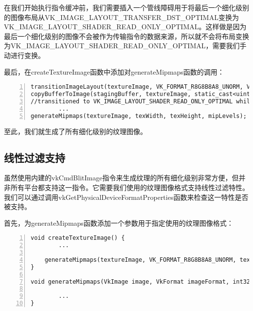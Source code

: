 \documentclass{ctexart}
\begin{document}
在我们开始执行指令缓冲前，我们需要插入一个管线障碍用于将最后一个细化级别的图像布局从VK\_IMAGE\_LAYOUT\_TRANSFER\_DST\_OPTIMAL变换为VK\_IMAGE\_LAYOUT\_SHADER\_READ\_ONLY\_OPTIMAL。这样做是因为最后一个细化级别的图像不会被作为传输指令的数据来源，所以就不会将布局变换为VK\_IMAGE\_LAYOUT\_SHADER\_READ\_ONLY\_OPTIMAL，需要我们手动进行变换。

最后，在createTextureImage函数中添加对generateMipmaps函数的调用：

\begin{lstlisting}[language={[ANSI]C},keywordstyle=\color{blue!70},commentstyle=\color{red!50!green!50!blue!50},frame=shadowbox, rulesepcolor=\color{red!20!green!20!blue!20},basicstyle=\small,numbers=left, numberstyle=\tiny,breaklines=true]
transitionImageLayout(textureImage, VK_FORMAT_R8G8B8A8_UNORM, VK_IMAGE_LAYOUT_UNDEFINED, VK_IMAGE_LAYOUT_TRANSFER_DST_OPTIMAL, mipLevels);
copyBufferToImage(stagingBuffer, textureImage, static_cast<uint32_t>(texWidth),  static_cast<uint32_t>(texHeight));
//transitioned to VK_IMAGE_LAYOUT_SHADER_READ_ONLY_OPTIMAL while generating mipmaps
		...
generateMipmaps(textureImage, texWidth, texHeight, mipLevels);
\end{lstlisting}

至此，我们就生成了所有细化级别的纹理图像。

\subsection{线性过滤支持}

虽然使用内建的vkCmdBlitImage指令来生成纹理的所有细化级别非常方便，但并非所有平台都支持这一指令。它需要我们使用的纹理图像格式支持线性过滤特性。我们可以通过调用vkGetPhysicalDeviceFormatProperties函数来检查这一特性是否被支持。

首先，为generateMipmaps函数添加一个参数用于指定使用的纹理图像格式：

\begin{lstlisting}[language={[ANSI]C},keywordstyle=\color{blue!70},commentstyle=\color{red!50!green!50!blue!50},frame=shadowbox, rulesepcolor=\color{red!20!green!20!blue!20},basicstyle=\small,numbers=left, numberstyle=\tiny,breaklines=true]
void createTextureImage() {
		...

	generateMipmaps(textureImage, VK_FORMAT_R8G8B8A8_UNORM, texWidth, texHeight, mipLevels);
}

void generateMipmaps(VkImage image, VkFormat imageFormat, int32_t texWidth, int32_t texHeight, uint32_t mipLevels) {

		...
}
\end{lstlisting}
\end{document}
